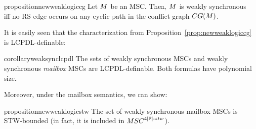 \documentclass[a4paper,UKenglish,cleveref, autoref, thm-restate]{lipics-v2021}
\begin{document}
\begin{restatable}{proposition}{newweaklogiccg}
\label{prop:newweaklogiccg}
Let $M$ be an MSC. Then, $M$ is weakly synchronous iff no RS edge occurs on any cyclic path in the conflict graph $\cgraph{\msc}$.
\end{restatable}


It is easily seen that the characterization from
Proposition~\ref{prop:newweaklogiccg} is LCPDL-definable:

\begin{restatable}{corollary}{weaksynclcpdl}
\label{cor:weak-sync-lcpdl}
The sets of weakly synchronous MSCs and weakly synchronous \emph{mailbox} MSCs are LCPDL-definable.
Both formulas have polynomial size.
\end{restatable}

Moreover, under the mailbox semantics, we can show:

\begin{restatable}{proposition}{newweaklogicstw}
	\label{prop:new-weak-logic-bounded}
The set of weakly synchronous mailbox MSCs is
STW-bounded (in fact, it is included in $\stwMSCs{4|\Procs|}$).
\end{restatable}
\end{document}

